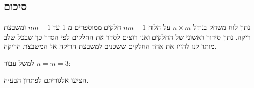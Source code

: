 \subsection*{סיכום}
\begin{example}
נתון לוח משחק בגודל 
$n \times m$
על הלוח 
$nm - 1$
חלקים ממוספרים מ-1 עד 
$nm - 1$
ומשבצת ריקה.
נתון סידור ראשוני של החלקים ואנו רוצים לסדר את החלקים לפי הסדר 
כך שבכל שלב מותר לנו להזיז את אחד החלקים ששכנים למשבצת הריקה אל המשבצת הריקה.
\end{example}
למשל עבור
$n = m = 3$:
\begin{center}
\end{center}


הציעו אלגוריתם לפתרון הבעיה.
